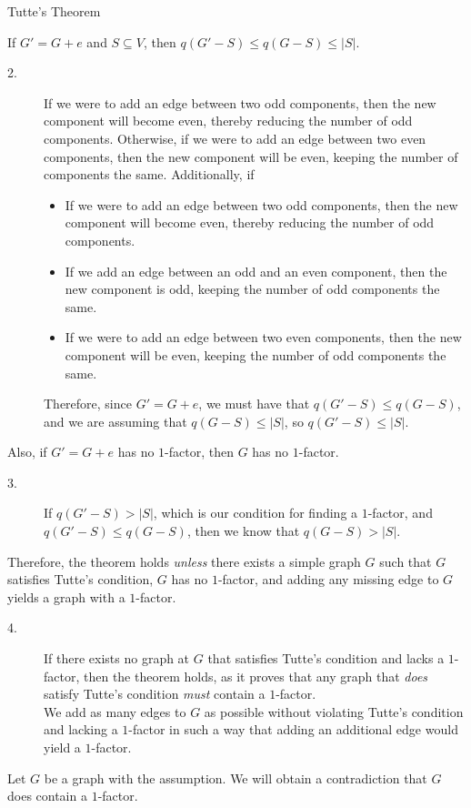 \documentclass[9pt]{extarticle}
\begin{document}
{\begin{problem}{Tutte's Theorem}
\begin{description}[font=\scshape]
        If $G' = G+e$ and $S\subseteq V$, then $q(G'-S)\leq q(G-S) \leq |S|$.
        \begin{description}
          \item[2.] If we were to add an edge between two odd components, then the new component will become even, thereby reducing the number of odd components. Otherwise, if we were to add an edge between two even components, then the new component will be even, keeping the number of components the same. Additionally, if 
            \begin{itemize}
              \item  If we were to add an edge between two odd components, then the new component will become even, thereby reducing the number of odd components.
              \item If we add an edge between an odd and an even component, then the new component is odd, keeping the number of odd components the same.
              \item If we were to add an edge between two even components, then the new component will be even, keeping the number of odd components the same. 
            \end{itemize}
            Therefore, since $G' = G + e$, we must have that $q(G'-S) \leq q(G-S)$, and we are assuming that $q(G-S) \leq |S|$, so $q(G'-S) \leq |S|$.
        \end{description}
        Also, if $G' = G + e$ has no $1$-factor, then $G$ has no $1$-factor.
        \begin{description}
          \item[3.] If $q(G'-S) > |S|$, which is our condition for finding a $1$-factor, and $q(G'-S) \leq q(G-S)$, then we know that $q(G-S) > |S|$.
        \end{description}
        Therefore, the theorem holds \textit{unless} there exists a simple graph $G$ such that $G$ satisfies Tutte's condition, $G$ has no $1$-factor, and adding any missing edge to $G$ yields a graph with a $1$-factor.
        \begin{description}
          \item[4.] If there exists no graph at $G$ that satisfies Tutte's condition and lacks a $1$-factor, then the theorem holds, as it proves that any graph that \textit{does} satisfy Tutte's condition \textit{must} contain a $1$-factor.\\

            We add as many edges to $G$ as possible without violating Tutte's condition and lacking a $1$-factor in such a way that adding an additional edge would yield a $1$-factor.
        \end{description}
        Let $G$ be a graph with the assumption. We will obtain a contradiction that $G$ does contain a $1$-factor.\\


\end{description}
\end{problem}}
\end{document}
